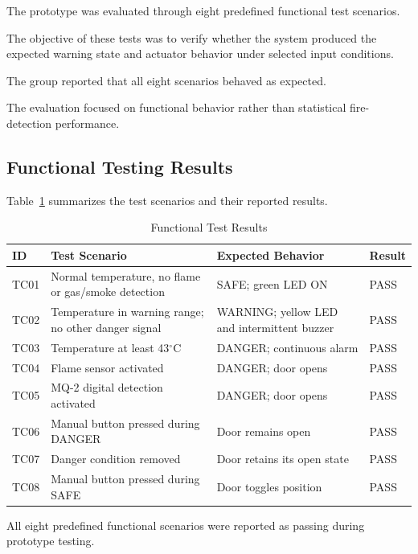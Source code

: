 \documentclass[12pt,a4paper]{article}
\begin{document}
The prototype was evaluated through
eight predefined functional test scenarios.

The objective of these tests was to verify
whether the system produced the expected
warning state and actuator behavior
under selected input conditions.

The group reported that all eight
scenarios behaved as expected.

The evaluation focused on functional
behavior rather than statistical
fire-detection performance.

\subsection{Functional Testing Results}

Table~\ref{tab:tests} summarizes the
test scenarios and their reported results.

\begin{table}[!htbp]
\centering
\caption{Functional Test Results}
\label{tab:tests}
\renewcommand{\arraystretch}{1.15}
\small
\begin{tabular}{|p{1cm}|p{5.2cm}|p{5cm}|p{1.2cm}|}
\hline
\textbf{ID} &
\textbf{Test Scenario} &
\textbf{Expected Behavior} &
\textbf{Result} \\
\hline
TC01 &
Normal temperature, no flame or gas/smoke detection &
SAFE; green LED ON &
PASS \\
\hline
TC02 &
Temperature in warning range; no other danger signal &
WARNING; yellow LED and intermittent buzzer &
PASS \\
\hline
TC03 &
Temperature at least 43$^\circ$C &
DANGER; continuous alarm &
PASS \\
\hline
TC04 &
Flame sensor activated &
DANGER; door opens &
PASS \\
\hline
TC05 &
MQ-2 digital detection activated &
DANGER; door opens &
PASS \\
\hline
TC06 &
Manual button pressed during DANGER &
Door remains open &
PASS \\
\hline
TC07 &
Danger condition removed &
Door retains its open state &
PASS \\
\hline
TC08 &
Manual button pressed during SAFE &
Door toggles position &
PASS \\
\hline
\end{tabular}
\end{table}
\FloatBarrier

All eight predefined functional scenarios
were reported as passing during prototype
testing.
\end{document}
